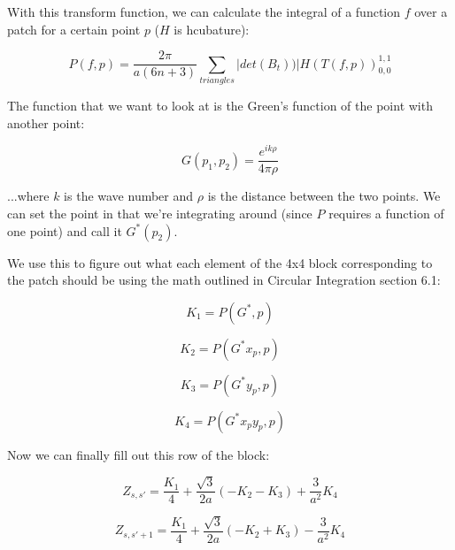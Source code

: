 \documentclass[etd,oneside,senior]{BYUPhys}
\begin{document}
With this transform function, we can calculate the integral of a function
$f$ over a patch for a certain point $p$ ($H$ is hcubature):

\begin{equation}
  P\left(f,p\right)=\frac{2\pi}{a\left(6n+3\right)}\sum_{triangles}|det\left(B_{t}\right))|H\left(T\left(f,p\right)\right)_{0,0}^{1,1}
\end{equation}

The function that we want to look at is the Green's function of the
point with another point:

\begin{equation}
  G\left(p_{1},p_{2}\right)=\frac{e^{ik\rho}}{4\pi\rho}
\end{equation}

...where $k$ is the wave number and $\rho$ is the distance between
the two points. We can set the point in that we're integrating around
(since $P$ requires a function of one point) and call it $G^{*}\left(p_{2}\right)$.

We use this to figure out what each element of the 4x4 block corresponding
to the patch should be using the math outlined in Circular Integration
section 6.1:

\begin{equation}
  K_{1}=P\left(G^{*},p\right)
\end{equation}

\begin{equation}
  K_{2}=P\left(G^{*}x_{p},p\right)
\end{equation}

\begin{equation}
  K_{3}=P\left(G^{*}y_{p},p\right)
\end{equation}

\begin{equation}
  K_{4}=P\left(G^{*}x_{p}y_{p},p\right)
\end{equation}

Now we can finally fill out this row of the block:

\begin{equation}
  Z_{s,s'}=\frac{K_{1}}{4}+\frac{\sqrt{3}}{2a}\left(-K_{2}-K_{3}\right)+\frac{3}{a^{2}}K_{4}
\end{equation}

\begin{equation}
  Z_{s,s'+1}=\frac{K_{1}}{4}+\frac{\sqrt{3}}{2a}\left(-K_{2}+K_{3}\right)-\frac{3}{a^{2}}K_{4}
\end{equation}
\end{document}
